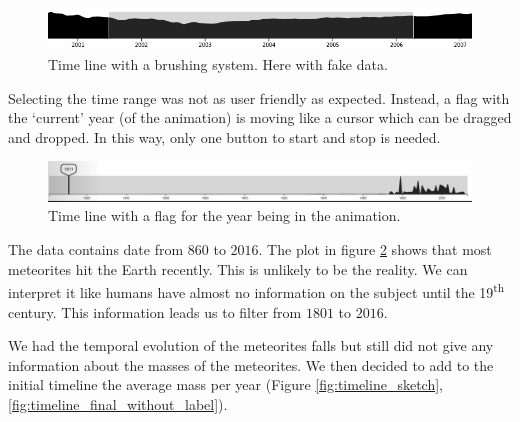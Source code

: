 \documentclass[10pt,conference,compsocconf]{IEEEtran}
\begin{document}
\begin{figure}[H]
  \centering
  \includegraphics[width=\columnwidth]{images/timeline_brush.png}
  \vspace{-3mm}
  \caption{Time line with a brushing system. Here with fake data.}
  \label{fig:timeline_brush}
\end{figure}

Selecting the time range was not as user friendly as expected. Instead, a flag with the `current' year (of the animation) is moving like a cursor which can be dragged and dropped. In this way, only one button to start and stop is needed.

\begin{figure}[H]
  \centering
  \includegraphics[width=\columnwidth]{images/timeline_original.jpg}
  \vspace{-3mm}
  \caption{Time line with a flag for the year being in the animation.}
  \label{fig:timeline_all_dates}
\end{figure}

The data contains date from $860$ to $2016$. The plot in figure \ref{fig:timeline_all_dates} shows that most meteorites hit the Earth recently. This is unlikely to be the reality. We can interpret it like humans have almost no information on the subject until the 19\textsuperscript{th} century. This information leads us to filter from $1801$ to $2016$.

We had the temporal evolution of the meteorites falls but still did not give any information about the masses of the meteorites. We then decided to add to the initial timeline the average mass per year (Figure \ref{fig:timeline_sketch},\ref{fig:timeline_final_without_label}).
\end{document}
